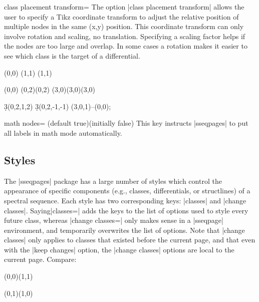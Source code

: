 \documentclass{ltxdoc}
\begin{document}
\begin{sseqdata}[name=ex1,degree={#1}{1-#1}]
\begin{key}{class placement transform=}
The option |class placement transform| allows the user to specify a Tikz coordinate transform to adjust the relative position of multiple nodes in the same (x,y) position. This coordinate transform can only involve rotation and scaling, no translation. Specifying a scaling factor helps if the nodes are too large and overlap. In some cases a rotation makes it easier to see which class is the target of a differential.
\begin{codeexample}[width=5cm]
\begin{sseqpage}[classes={draw=none},class placement transform={xscale=3},
                 math nodes, xscale=2, x axis extend end=0.7cm]
\class["\mathbb{Z}"](0,0)
\class["\mathbb{Z}/2"](1,1)
\class["\mathbb{Z}/3"](1,1)
\end{sseqpage}
\end{codeexample}
\begin{codeexample}[width=5cm]
\begin{sseqpage}[classes=fill,class placement transform={rotate=40},
                 cohomological Serre grading,differentials=blue,scale=0.7]
\class(0,0)
\class(0,2)\class(0,2)
\class[red](3,0)\class[green](3,0)\class[blue](3,0)

\d3(0,2,1,2)
\d3(0,2,-1,-1)
\draw[->,red](3,0,1)--(0,0);
\end{sseqpage}
\end{codeexample}
\end{key}

\begin{key}{math nodes= (default true)(initially false)}
This key instructs |sseqpages| to put all labels in math mode automatically.
\end{key}

\subsection{Styles}
The |sseqpages| package has a large number of styles which control the appearance of specific components (e.g., classes, differentials, or structlines) of a spectral sequence. Each style has two corresponding keys: |classes| and |change classes|.  Saying|classes=| adds the keys to the list of options used to style every future class, whereas |change classes=| only makes sense in a |sseqpage| environment, and temporarily overwrites the list of options. Note that |change classes| only applies to classes that existed before the current page, and that even with the |keep changes| option, the |change classes| options are local to the current page. Compare:
\begin{codeexample}[width=8cm]
\begin{sseqdata}[name=stylesex]
\class(0,0)\class(1,1)
\end{sseqdata}
\begin{sseqpage}[name=stylesex,classes={fill,blue},
    title={change new classes}
]
\class(0,1)\class(1,0)
\end{sseqpage}


\end{codeexample}
\end{sseqdata}
\end{document}
